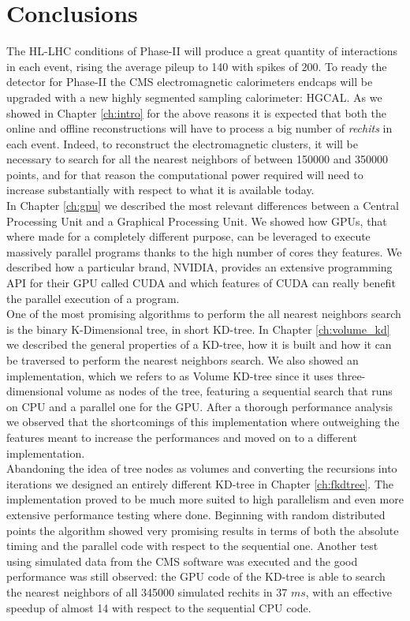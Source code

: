 \chapter{Conclusions}\label{ch:conclusion}
The HL-LHC conditions of Phase-II will produce a great quantity of interactions in each event, rising the average pileup to 140 with spikes of 200. To ready the detector for Phase-II the CMS electromagnetic calorimeters endcaps will be upgraded with a new highly segmented sampling calorimeter: HGCAL. As we showed in Chapter \ref{ch:intro} for the above reasons it is expected that both the online and offline reconstructions will have to process a big number of \textit{rechits} in each event. Indeed, to reconstruct the electromagnetic clusters, it will be necessary to search for all the nearest neighbors of between 150000 and 350000 points, and for that reason the computational power required will need to increase substantially with respect to what it is available today.
\vspace{0.5cm}
\\
In Chapter \ref{ch:gpu} we described the most relevant differences between a Central Processing Unit and a Graphical Processing Unit. We showed how GPUs, that where made for a completely different purpose, can be leveraged to execute massively parallel programs thanks to the high number of cores they features. We described how a particular brand, NVIDIA, provides an extensive programming API for their GPU called CUDA and which features of CUDA can really benefit the parallel execution of a program.
\vspace{0.5cm}
\\
One of the most promising algorithms to perform the all nearest neighbors search is the binary K-Dimensional tree, in short KD-tree. In Chapter \ref{ch:volume_kd} we described the general properties of a KD-tree, how it is built and how it can be traversed to perform the nearest neighbors search. We also showed an implementation, which we refers to as Volume KD-tree since it uses three-dimensional volume as nodes of the tree, featuring a sequential search that runs on CPU and a parallel one for the GPU. After a thorough performance analysis we observed that the shortcomings of this implementation where outweighing the features meant to increase the performances and moved on to a different implementation.
\vspace{0.5cm}
\\
Abandoning the idea of tree nodes as volumes and converting the recursions into iterations we designed an entirely different KD-tree in Chapter \ref{ch:fkdtree}. The implementation proved to be much more suited to high parallelism and even more extensive performance testing where done. Beginning with random distributed points the algorithm showed very promising results in terms of both the absolute timing and the parallel code with respect to the sequential one. Another test using simulated data from the CMS software was executed and the good performance was still observed: the GPU code of the KD-tree is able to search the nearest neighbors of all 345000 simulated rechits in 37 $\unit{ms}$, with an effective speedup of almost 14 with respect to the sequential CPU code.

